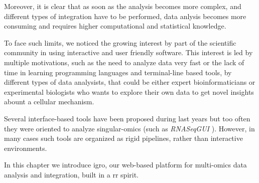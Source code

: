 Moreover, it is clear that as soon as the analysis becomes more complex, and different types of integration have to be performed, data anlysis becomes more consuming and requires higher computational and statistical knowledge.


To face such limits, we noticed the growing interest by part of the scientific community in using interactive and user friendly software.
This interest is led by multiple motivations, such as the need to analyze data very fast or the lack of time in learning programming languages and terminal-line based tools, by different types of data analysists, that could be either expert bioinformaticians or experimental biologists who wants to explore their own data to get novel insights abount a cellular mechanism.

Several interface-based tools \cite{Poplawski2016} have been proposed during last years but too often they were oriented to analyze singular-omics (such as \textit{RNASeqGUI} \cite{russo2015advantages}).
However, in many cases such tools are organized as rigid pipelines, rather than interactive environments.

In this chapter we introduce \gls{igro}, our web-based platform for multi-omics data analysis and integration, built in a \gls{rr} spirit.


%
%
%
%


